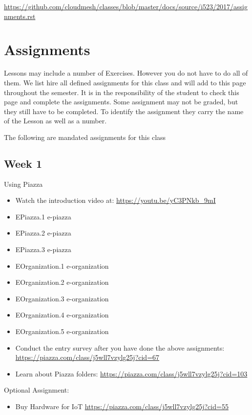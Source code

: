 \begin{fileremark}\url{https://github.com/cloudmesh/classes/blob/master/docs/source/i523/2017/assignments.rst}\end{fileremark}
\section{Assignments}\label{assignments}

Lessons may include a number of Exercises. However you do not have to do
all of them. We list hire all defined assignments for this class and
will add to this page throughout the semester. It is in the
responsibility of the student to check this page and complete the
assignments. Some assignment may not be graded, but they still have to
be completed. To identify the assignment they carry the name of the
Lesson as well as a number.

The following are mandated assignments for this class

\subsection{Week 1}\label{week-1}

Using Piazza

\begin{itemize}
\tightlist
\item
  Watch the introduction video at: \url{https://youtu.be/yC3PNkb_9mI}
\item
  EPiazza.1 e-piazza
\item
  EPiazza.2 e-piazza
\item
  EPiazza.3 e-piazza
\item
  EOrganization.1 e-organization
\item
  EOrganization.2 e-organization
\item
  EOrganization.3 e-organization
\item
  EOrganization.4 e-organization
\item
  EOrganization.5 e-organization
\item
  Conduct the entry survey after you have done the above assignments:
  \url{https://piazza.com/class/j5wll7vzylg25j?cid=67}
\item
  Learn about Piazza folders:
  \url{https://piazza.com/class/j5wll7vzylg25j?cid=103}
\end{itemize}

Optional Assignment:

\begin{itemize}
\tightlist
\item
  Buy Hardware for IoT
  \url{https://piazza.com/class/j5wll7vzylg25j?cid=55}
\end{itemize}

